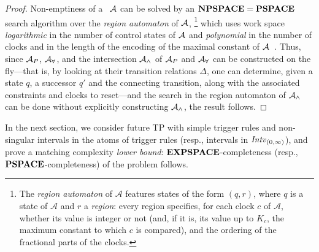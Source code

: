 \begin{proof}
Non-emptiness of a \TA\ $\mathcal{A}$ can be solved by an $\textbf{NPSPACE}=\textbf{PSPACE}$ search algorithm over the \emph{region automaton} of $\mathcal{A}$,%
\footnote{The \emph{region automaton} of $\mathcal{A}$ features states of the form $(q,r)$, 
where $q$ is a state of $\mathcal{A}$ and $r$ a \emph{region}: every region specifies, for each clock $c$ of $\mathcal{A}$, whether its value is integer or not (and, if it is, its value up to $K_c$, the maximum constant to which $c$ is compared), and the ordering of the fractional parts of the clocks.}
 which uses work space \emph{logarithmic} in the number of control 
states of $\mathcal{A}$ and \emph{polynomial}
in the number of clocks and in the length of the encoding of the maximal constant of $\mathcal{A}$~\cite{ALUR1994183}.
  Thus, since $\mathcal{A}_P$, $\mathcal{A}_\forall$, and the intersection $\mathcal{A}_\wedge$ of $\mathcal{A}_P$ and $\mathcal{A}_\forall$ can be constructed on the fly---that is, by looking at their transition relations $\Delta$, one can determine, given a state $q$, a successor $q'$ and the connecting transition, along with the associated constraints and clocks to reset---and the search in the region automaton of
$\mathcal{A}_\wedge$ can be done without explicitly constructing $\mathcal{A}_\wedge$, the result follows.
\end{proof} 

In the next section, we consider future TP with simple trigger rules and non-singular intervals in the atoms of trigger rules (resp., intervals in ${\mathit{Intv}}_{(0,\infty)}$), and prove a matching complexity \emph{lower bound}: $\textbf{EXPSPACE}$-completeness (resp., $\textbf{PSPACE}$-completeness) of the problem follows.